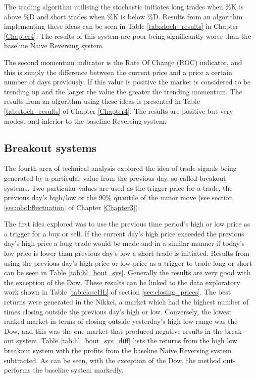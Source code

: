 The trading algorithm utilising the stochastic initiates long trades when \%K is above \%D and short trades when \%K is below \%D. Results from an algorithm implementing these ideas can be seen in  Table \ref{tab:stoch_results} in Chapter \ref{Chapter4}. The results of this system are poor being significantly worse than the baseline Naive Reversing system. 


The second momentum indicator is the Rate Of Change (ROC) indicator, and this is simply the difference between the current price and a price a certain number of days previously. If this value is positive the market is considered to be trending up and the larger the value the greater the trending momentum. The results from an algorithm using these ideas is presented in Table \ref{tab:stoch_results} of Chapter \ref{Chapter4}. The results are positive but very modest and inferior to the baseline Reversing system.

\subsection{Breakout systems}
The fourth area of technical analysis explored the idea of trade signals being generated by a particular value from the previous day, so-called breakout systems. Two particular values are used as the trigger price for a trade, the previous day's high/low or the 90\% quantile of the minor move (see section \ref{sec:ohol:fluctuation} of Chapter \ref{Chapter3}). 

The first idea explored was to use the previous time period's high or low price as a trigger for a buy or sell. If the current day's high price exceeded the previous day's high price a long trade would be made and in a similar manner if today's low price is lower than previous day's low a short trade is initiated. Results from using the previous day's high price or low price as a trigger to trade long or short can be seen in Table \ref{tab:hl_bout_sys}. Generally the results are very good with the exception of the Dow. These results can be linked to the data exploratory work shown in Table \ref{tab:closeHL} of section \ref{sec:closing_prices}. The best returns were generated in the Nikkei, a market which had the highest number of times closing outside the previous day's high or low. Conversely, the lowest ranked market in terms of closing outside yesterday's high low range was the Dow, and this was the one market that produced negative results in the break-out system. Table \ref{tab:hl_bout_sys_diff} lists the returns from the high low breakout system with the profits from the baseline Naive Reversing system subtracted. As can be seen, with the exception of the Dow, the method out-performs the baseline system markedly.

